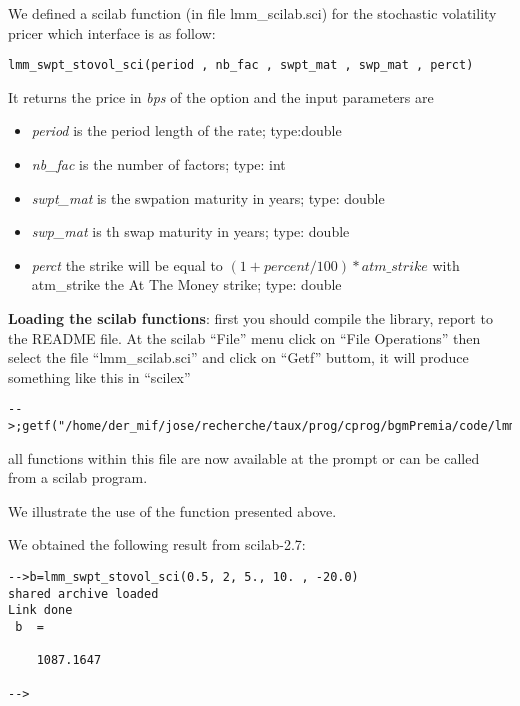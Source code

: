 We defined a scilab function (in file lmm\_scilab.sci) for the stochastic volatility pricer which interface is as follow:


\small{
\begin{verbatim}
lmm_swpt_stovol_sci(period , nb_fac , swpt_mat , swp_mat , perct)
\end{verbatim} 
}

It returns the price in {\it bps} of the option and the input parameters are 

\begin{itemize}
\item {\it period} is the period length of the rate; type:double
\item {\it nb\_fac} is the number of factors; type: int
\item {\it swpt\_mat} is the swpation maturity in years; type: double
\item {\it swp\_mat} is th swap maturity in years; type: double
\item {\it perct} the strike will be equal to $(1+percent/100)*atm\_strike$ with atm\_strike the At The Money strike; type: double
\end{itemize}

{\bf Loading the scilab functions}: first you should compile the library, report to the README file. At the scilab ``File'' menu click on ``File Operations'' then select the file ``lmm\_scilab.sci'' and click on ``Getf'' buttom, it will produce something like this in ``scilex''
\small{
\begin{verbatim} 
-->;getf("/home/der_mif/jose/recherche/taux/prog/cprog/bgmPremia/code/lmm_scilab.sci");
\end{verbatim} 
}

all functions within this file are now available at the prompt or can be called from a scilab program. 
 
We illustrate the use of the function presented above. 

We obtained the following result from scilab-2.7:


\small{
\begin{verbatim}
-->b=lmm_swpt_stovol_sci(0.5, 2, 5., 10. , -20.0)         
shared archive loaded
Link done
 b  =
 
    1087.1647  
 
-->   
\end{verbatim} 
}


